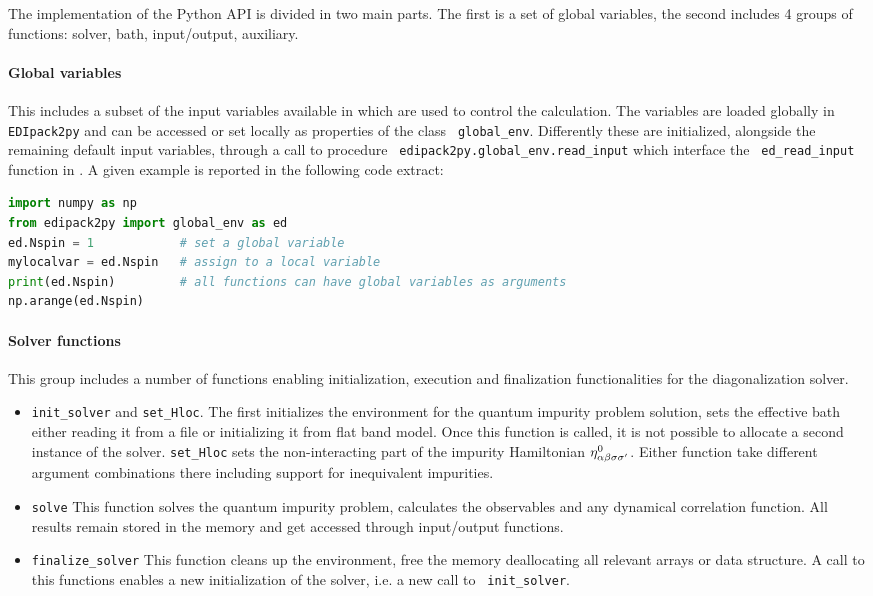 \documentclass[edipack2.tex]{subfiles}
\begin{document}
The implementation of the Python API is divided in two main parts. The
first is a set of global variables, the second includes 4 groups of
functions: solver, bath, input/output, auxiliary. 

\paragraph{{\bf Global variables}}
This includes a subset of the input variables available in \NAME which
are used to control the calculation.
The variables are loaded globally in {\tt EDIpack2py} and can be accessed
or set locally as properties of the class {\tt
  global\_env}. Differently these are initialized, alongside the remaining
default input variables, through a call to procedure {\tt
  edipack2py.global\_env.read\_input} which interface the {\tt
  ed\_read\_input} function in \NAME. 
A given example is reported in the following code extract:

\begin{lstlisting}[language=python,  frame=lines]
import numpy as np
from edipack2py import global_env as ed
ed.Nspin = 1            # set a global variable
mylocalvar = ed.Nspin   # assign to a local variable
print(ed.Nspin)         # all functions can have global variables as arguments
np.arange(ed.Nspin)
\end{lstlisting}


\paragraph{{\bf Solver functions}}
This group includes a number of functions enabling initialization,
execution and finalization  functionalities for the diagonalization
solver.
\begin{itemize}
  \item {\tt init\_solver} and {\tt set\_Hloc}. The first 
    initializes the \NAME environment for the quantum impurity problem
    solution, sets the effective bath either reading it from a file or
    initializing it from flat band model. Once this function is
    called, it is not possible to allocate a second instance of the solver.
    {\tt set\_Hloc} sets the
    non-interacting part of the impurity Hamiltonian $\eta^0_{\alpha\beta\sigma\sigma'}$. 
    Either function take different argument combinations there
    including support for inequivalent impurities.

  \item {\tt solve} This function solves the quantum impurity problem,
    calculates the observables and any dynamical correlation
    function. All results remain stored in the memory and get accessed
    through input/output functions.

  \item {\tt finalize\_solver} This function cleans up the \NAME
    environment, free the memory deallocating all relevant arrays or
    data structure. A call to this functions enables a new
    initialization of the solver, i.e. a new call to {\tt
      init\_solver}.  
  \end{itemize}
\end{document}
